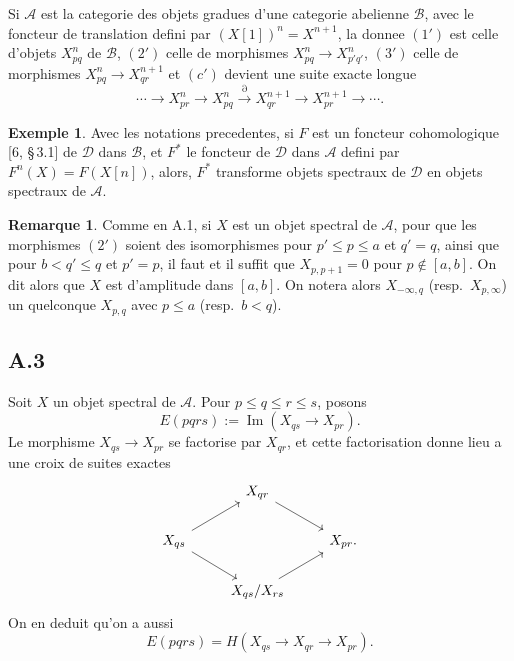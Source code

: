 \documentclass[11pt,a4paper]{article}
\theoremstyle{plain}
\theoremstyle{definition}
\newtheorem{example}[theorem]{Exemple}
\newtheorem{remark}[theorem]{Remarque}
\newcommand{\cD}{\mathscr{D}}
\newcommand{\cA}{\mathscr{A}}
\newcommand{\cB}{\mathscr{B}}
\begin{document}
Si $\cA$ est la categorie des objets gradues d'une categorie abelienne $\cB$, avec le foncteur de translation defini par $(X[1])^n = X^{n+1}$, la donnee $(1')$ est celle d'objets $X_{pq}^n$ de $\cB$, $(2')$ celle de morphismes $X_{pq}^n \to X_{p'q'}^n$, $(3')$ celle de morphismes $X_{pq}^n \to X_{qr}^{n+1}$ et $(c')$ devient une suite exacte longue
\[
\cdots \to X_{pr}^n \to X_{pq}^n \xrightarrow{\partial} X_{qr}^{n+1} \to X_{pr}^{n+1} \to \cdots.
\]

\begin{example}
Avec les notations precedentes, si $F$ est un foncteur cohomologique [6, \S\,3.1] de $\cD$ dans $\cB$, et $F^*$ le foncteur de $\cD$ dans $\cA$ defini par $F^n(X) = F(X[n])$, alors, $F^*$ transforme objets spectraux de $\cD$ en objets spectraux de $\cA$.
\end{example}

\begin{remark}
Comme en A.1, si $X$ est un objet spectral de $\cA$, pour que les morphismes $(2')$ soient des isomorphismes pour $p' \leqslant p \leqslant a$ et $q'=q$, ainsi que pour $b < q' \leqslant q$ et $p'=p$, il faut et il suffit que $X_{p,p+1} = 0$ pour $p \notin [a,b]$. On dit alors que $X$ est d'amplitude dans $[a,b]$. On notera alors $X_{-\infty,q}$ (resp.~$X_{p,\infty}$) un quelconque $X_{p,q}$ avec $p \leqslant a$ (resp.~$b < q$).
\end{remark}

\subsection*{A.3}
Soit $X$ un objet spectral de $\cA$. Pour $p \leqslant q \leqslant r \leqslant s$, posons
\begin{equation}\label{eq:A.3.1}
E(pqrs) := \operatorname{Im}(X_{qs} \to X_{pr}).
\end{equation}
Le morphisme $X_{qs} \to X_{pr}$ se factorise par $X_{qr}$, et cette factorisation donne lieu a une croix de suites exactes
\[
\begin{tikzcd}
& X_{qr} \arrow[rd] \\
X_{qs} \arrow[ru] \arrow[rd] & & X_{pr}. \\
& X_{qs}/X_{rs} \arrow[ru]
\end{tikzcd}
\]
On en deduit qu'on a aussi
\begin{equation}\label{eq:A.3.2}
E(pqrs) = H(X_{qs} \to X_{qr} \to X_{pr}).
\end{equation}
\end{document}
